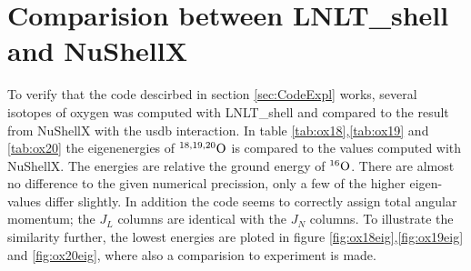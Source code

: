 \section{Comparision between LNLT\_shell and NuShellX}

To verify that the code descirbed in section \ref{sec:CodeExpl} works, several isotopes of oxygen was computed with LNLT\_shell and compared to the result from NuShellX with the usdb interaction. In table \ref{tab:ox18},\ref{tab:ox19} and \ref{tab:ox20} the eigenenergies of \(^{18,19,20}\rm{O}\) is compared to the values computed with NuShellX. The energies are relative the ground energy of \(^{16}\rm{O}\). There are almost no difference to the given numerical precission, only a few of the higher eigen-values differ slightly. In addition the code seems to correctly assign total angular momentum; the \(J_L\) columns are identical with the \(J_N\) columns. To illustrate the similarity further, the lowest energies are ploted in figure \ref{fig:ox18eig},\ref{fig:ox19eig} and \ref{fig:ox20eig}, where also a comparision to experiment is made.

